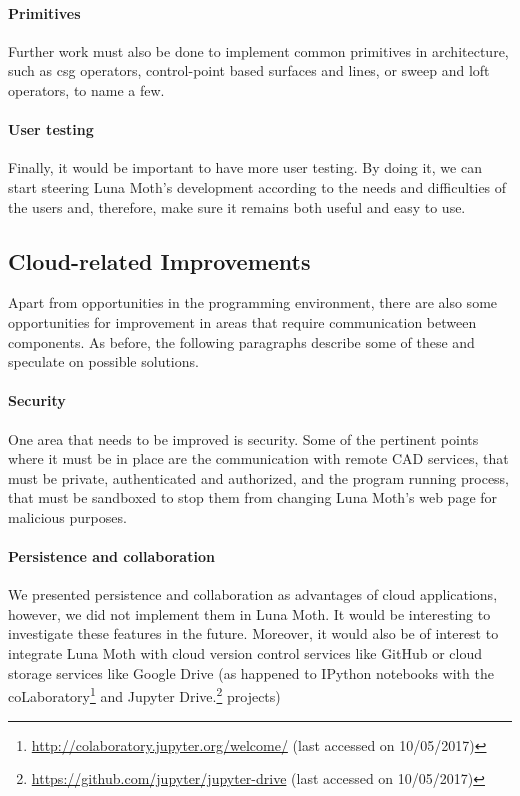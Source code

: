 \paragraph{Primitives}
Further work must also be done to implement common primitives in architecture, such as \gls{csg} operators, control-point based surfaces and lines, or sweep and loft operators, to name a few.

\paragraph{User testing}
Finally, it would be important to have more user testing.
By doing it, we can start steering Luna Moth's development according to the needs and difficulties of the users and, therefore, make sure it remains both useful and easy to use.


\subsection{Cloud-related Improvements}
Apart from opportunities in the programming environment, there are also some opportunities for improvement in areas that require communication between components.
As before, the following paragraphs describe some of these and speculate on possible solutions.

\paragraph{Security}
One area that needs to be improved is security.
Some of the pertinent points where it must be in place are the communication with remote CAD services, that must be private, authenticated and authorized, and the program running process, that must be sandboxed to stop them from changing Luna Moth's web page for malicious purposes.

\paragraph{Persistence and collaboration}
We presented persistence and collaboration as advantages of cloud applications, however, we did not implement them in Luna Moth.
It would be interesting to investigate these features in the future.
Moreover, it would also be of interest to integrate Luna Moth with cloud version control services like GitHub or cloud storage services like Google Drive (as happened to IPython notebooks with the coLaboratory\footnote{\url{http://colaboratory.jupyter.org/welcome/} (last accessed on 10/05/2017)} and Jupyter Drive.\footnote{\url{https://github.com/jupyter/jupyter-drive} (last accessed on 10/05/2017)} projects)

